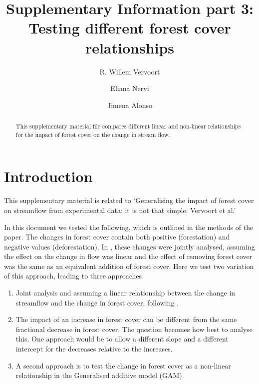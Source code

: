\documentclass[]{elsarticle} %
\begin{document}
\begin{frontmatter}

  \title{Supplementary Information part 3: Testing different forest cover relationships}
    \author[]{R. Willem Vervoort%
  }
    \author[]{Eliana Nervi}
    \author[]{Jimena Alonso}
  
  \begin{abstract}
  This supplementary material file compares different linear and non-linear relationships for the impact of forest cover on the change in stream flow.
  \end{abstract}
  
 \end{frontmatter}

\setcounter{table}{0} \renewcommand{\thetable}{S\arabic{table}} \setcounter{figure}{0} \renewcommand{\thefigure}{S\arabic{figure}}\setcounter{equation}{0} \renewcommand{\theequation}{S\arabic{equation}}

\hypertarget{introduction}{%
\section{Introduction}\label{introduction}}

This supplementary material is related to `Generalising the impact of forest cover on streamflow from experimental data: it is not that simple. Vervoort et al.'

In this document we tested the following, which is outlined in the methods of the paper.
The changes in forest cover contain both positive (forestation) and negative values (deforestation). In \citet{zhang2017}, these changes were jointly analysed, assuming the effect on the change in flow was linear and the effect of removing forest cover was the same as an equivalent addition of forest cover. Here we test two variation of this approach, leading to three approaches

\begin{enumerate}
\def\labelenumi{\arabic{enumi}.}
\item
  Joint analysis and assuming a linear relationship between the change in streamflow and the change in forest cover, following \citet{zhang2017}.
\item
  The impact of an increase in forest cover can be different from the same fractional decrease in forest cover. The question becomes how best to analyse this. One approach would be to allow a different slope and a different intercept for the decreases relative to the increases.
\item
  A second approach is to test the change in forest cover as a non-linear relationship in the Generalised additive model (GAM).
\end{enumerate}
\end{document}
